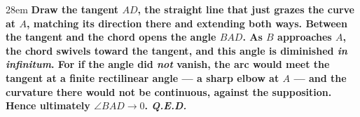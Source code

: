 \documentclass[border=4pt]{standalone}
\begin{document}
\begin{varwidth}{28em}
\large\bfseries
Draw the tangent $AD$, the straight line that just grazes the curve at $A$, matching its direction there and extending both ways. Between the tangent and the chord opens the angle $BAD$. As $B$ approaches $A$, the chord swivels toward the tangent, and this angle is diminished \emph{in infinitum}. For if the angle did \emph{not} vanish, the arc would meet the tangent at a finite rectilinear angle — a sharp elbow at $A$ — and the curvature there would not be continuous, against the supposition. Hence ultimately $\angle BAD \to 0$. \textit{Q.E.D.}
\end{varwidth}
\end{document}
